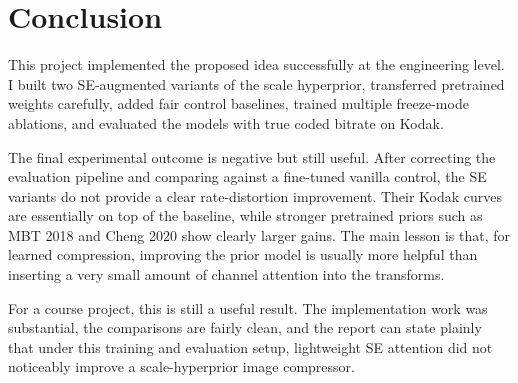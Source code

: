 \documentclass[10pt]{article}
\begin{document}
\FloatBarrier

\section{Conclusion}
This project implemented the proposed idea successfully at the engineering level. I built two SE-augmented variants of the scale hyperprior, transferred pretrained weights carefully, added fair control baselines, trained multiple freeze-mode ablations, and evaluated the models with true coded bitrate on Kodak.

The final experimental outcome is negative but still useful. After correcting the evaluation pipeline and comparing against a fine-tuned vanilla control, the SE variants do not provide a clear rate-distortion improvement. Their Kodak curves are essentially on top of the baseline, while stronger pretrained priors such as MBT 2018 and Cheng 2020 show clearly larger gains. The main lesson is that, for learned compression, improving the prior model is usually more helpful than inserting a very small amount of channel attention into the transforms.

For a course project, this is still a useful result. The implementation work was substantial, the comparisons are fairly clean, and the report can state plainly that under this training and evaluation setup, lightweight SE attention did not noticeably improve a scale-hyperprior image compressor.
\end{document}
